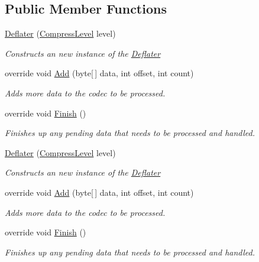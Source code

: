 \subsection*{Public Member Functions}
\begin{DoxyCompactItemize}
\item 
\hyperlink{class_dot_z_lib_1_1_deflater_a3af92869710011e866633c2186c7cab1}{Deflater} (\hyperlink{namespace_dot_z_lib_a034f7a1ef9856d8834e6f6b1c53d8a4c}{Compress\+Level} level)
\begin{DoxyCompactList}\small\item\em Constructs an new instance of the {\ttfamily \hyperlink{class_dot_z_lib_1_1_deflater}{Deflater}} \end{DoxyCompactList}\item 
override void \hyperlink{class_dot_z_lib_1_1_deflater_a2db95e3ca07e562df0652ed1ad8d0c4d}{Add} (byte\mbox{[}$\,$\mbox{]} data, int offset, int count)
\begin{DoxyCompactList}\small\item\em Adds more data to the codec to be processed. \end{DoxyCompactList}\item 
override void \hyperlink{class_dot_z_lib_1_1_deflater_a84507769a20a13c2ff48cfcef8f5c13b}{Finish} ()
\begin{DoxyCompactList}\small\item\em Finishes up any pending data that needs to be processed and handled. \end{DoxyCompactList}\item 
\hyperlink{class_dot_z_lib_1_1_deflater_a3af92869710011e866633c2186c7cab1}{Deflater} (\hyperlink{namespace_dot_z_lib_a034f7a1ef9856d8834e6f6b1c53d8a4c}{Compress\+Level} level)
\begin{DoxyCompactList}\small\item\em Constructs an new instance of the {\ttfamily \hyperlink{class_dot_z_lib_1_1_deflater}{Deflater}} \end{DoxyCompactList}\item 
override void \hyperlink{class_dot_z_lib_1_1_deflater_a2db95e3ca07e562df0652ed1ad8d0c4d}{Add} (byte\mbox{[}$\,$\mbox{]} data, int offset, int count)
\begin{DoxyCompactList}\small\item\em Adds more data to the codec to be processed. \end{DoxyCompactList}\item 
override void \hyperlink{class_dot_z_lib_1_1_deflater_a84507769a20a13c2ff48cfcef8f5c13b}{Finish} ()
\begin{DoxyCompactList}\small\item\em Finishes up any pending data that needs to be processed and handled. \end{DoxyCompactList}\end{DoxyCompactItemize}
